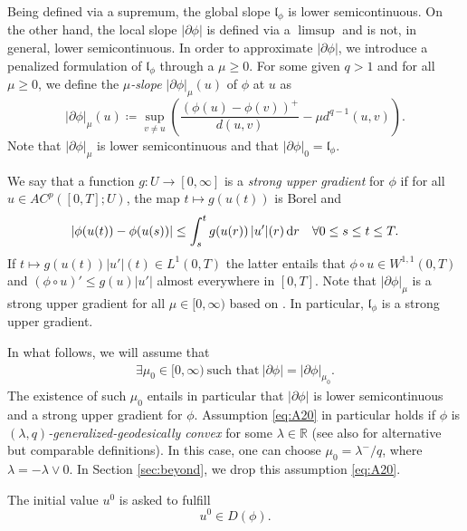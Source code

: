 \documentclass[reqno]{amsart}
\newcommand{\Rz}{\mathbb{R}}
\newcommand{\dr}{{\rm d} r}
\renewcommand{\sl}{|\partial \phi|}
\newcommand{\gl}{\mathfrak{l}_\phi}
\newcommand{\md}{|u'|}
\begin{document}
 Being defined via a supremum, 
the global slope $\gl$ is lower semicontinuous.  On the other hand, the local slope $\sl$  is defined via a $\limsup$ and is not, in general, lower semicontinuous. In order to  approximate $\sl$, we  introduce  a penalized formulation of $\gl$ through a $\mu \geq 0$. For some given $q>1$ and for all $\mu \geq 0$, we define the {\it $\mu$-slope} $\sl_\mu(u)$ of $\phi$ at $u$ as 
\begin{equation}\label{eq:slmu}
\sl_\mu(u) \coloneqq \sup_{v\not = u}\left(\frac{(\phi(u) -
    \phi(v))^+}{d(u,v)} - \mu d^{q-1}(u,v) \right).  
\end{equation} 
Note that $\sl_\mu$ is lower semicontinuous \cite[Prop. 2.7]{rsss} and  that
$\sl_0 = \gl$.

We say that a function $g: U \to [0,\infty]$ is a {\it strong upper gradient} for $\phi$
\cite[Def.~1.2.1, p.~27]{Ambrosio08} if for all $u\in AC^p([0,T];U)$,
the map
$t \mapsto g(u(t))$ is Borel and 
$$|\phi(u(t)) - \phi(u(s))| \leq \int_s^t g (u(r))\,\md(r) \, \dr
\quad \forall 0\leq s \leq t \leq T.$$
If $t \mapsto g (u(t))\md(t) \in L^1(0,T) $ the
latter entails that $\phi \circ u  \in W^{1,1}(0,T) $ and $(\phi
\circ u)' \le g (u) \md$ almost everywhere in $[0,T]$.  Note that
 $\sl_\mu$  is a strong upper gradient for all $\mu \in [0,\infty)$ based on  \cite[proof of Corollary 2.4.10]{Ambrosio08}. In
particular, 
$\gl$ is a strong upper gradient.

In what follows, we will assume that
\begin{align}
    \exists
  \mu_0 \in [0,\infty) \ \text{such that} \ \sl=\sl_{\mu_0}. \label{eq:A20}
\end{align}
 The existence of such $\mu_0$ entails in particular that $\sl$
is lower semicontinuous and a strong upper gradient for $\phi$. Assumption
\eqref{eq:A20} in particular holds if $\phi$ is {\it
  $(\lambda,q)$-generalized-geodesically convex} for some $\lambda \in
\Rz$  \cite{rsss}  (see also \cite{Ohta-Zhao,Shimoyama} for
alternative but comparable definitions).  In this case, one can choose   $\mu_0 = \lambda^-/q$, where
$\lambda = -\lambda \vee 0$. In Section \ref{sec:beyond}, we drop this assumption \eqref{eq:A20}. 

The initial value $u^0$ is asked to fulfill
\begin{equation}
  u^0\in D(\phi).\label{eq:A3}  
\end{equation}
\end{document}
